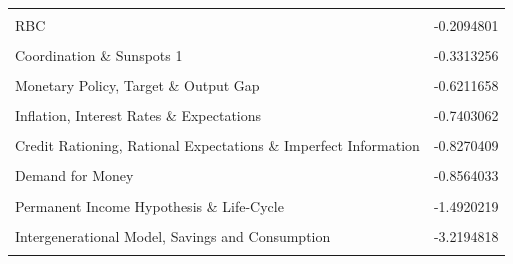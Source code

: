 \documentclass[]{elsarticle} %
\begin{document}
\begin{table}[!h]
\begin{tabular}[t]{lr}
\cellcolor{gray!6}{Endogenous Growth} & \cellcolor{gray!6}{-0.1105033}\\
RBC & -0.2094801\\
\cellcolor{gray!6}{Monetary Policy, Financial Transmission \& Cycles 1} & \cellcolor{gray!6}{-0.2379855}\\
Coordination \& Sunspots 1 & -0.3313256\\
\addlinespace
\cellcolor{gray!6}{Exchange Rate Dynamics \& Expectations} & \cellcolor{gray!6}{-0.4273431}\\
Monetary Policy, Target \& Output Gap & -0.6211658\\
\cellcolor{gray!6}{REH, Monetary Policy \& Business Cycles} & \cellcolor{gray!6}{-0.6758668}\\
Inflation, Interest Rates \& Expectations & -0.7403062\\
\cellcolor{gray!6}{Monetary Approach of Balance of Payments} & \cellcolor{gray!6}{-0.7658536}\\
\addlinespace
Credit Rationing, Rational Expectations \& Imperfect Information & -0.8270409\\
\cellcolor{gray!6}{Inflation \& Rigidities} & \cellcolor{gray!6}{-0.8396888}\\
Demand for Money & -0.8564033\\
\cellcolor{gray!6}{New Theory of Money: Search, Bargaining...} & \cellcolor{gray!6}{-1.2139877}\\
Permanent Income Hypothesis \& Life-Cycle & -1.4920219\\
\addlinespace
\cellcolor{gray!6}{Monetary Economics \& Demand for Money} & \cellcolor{gray!6}{-1.6768415}\\
Intergenerational Model, Savings and Consumption & -3.2194818\\
\cellcolor{gray!6}{Marginal Taxation} & \cellcolor{gray!6}{-3.3179236}\\
\bottomrule
\end{tabular}
\end{table}
\end{document}
